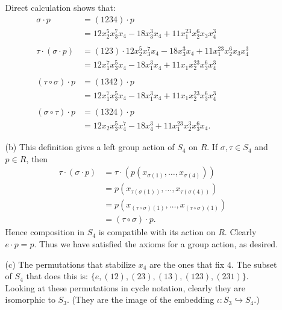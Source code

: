 \documentclass[12pt]{article}
\theoremstyle{remark}
\theoremstyle{named}
\begin{document}
\begin{enumerate}
\begin{enumerate}
        Direct calculation shows that:
        \begin{align*}
            \sigma \cdot p &= (1 2 3 4) \cdot p \\
            &= 12x_2^5 x_3^7 x_4 - 18 x_3^3 x_4 + 11 x_1^{23} x_2^6 x_3 x_4^3 \\ 
            \\
            \tau \cdot (\sigma \cdot p) &= (123) \cdot 12x_2^5 x_3^7 x_4 - 18 x_3^3 x_4 + 11 x_1^{23} x_2^6 x_3 x_4^3 \\
            &= 12 x_1^7 x_3^5 x_4 - 18 x_1^3 x_4 + 11 x_1 x_2^{23} x_3^6 x_4^3 \\ 
            \\
            (\tau \circ \sigma) \cdot p &= (1342) \cdot p \\ 
            &= 12 x_1^7 x_3^5 x_4 - 18 x_1^3 x_4 + 11 x_1 x_2^{23} x_3^6 x_4^3 \\ 
            \\
            (\sigma \circ \tau) \cdot p &= (1324) \cdot p \\
            &= 12 x_2 x_3^5 x_4^7 - 18 x_4^3 + 11 x_1^{23} x_2^3 x_3^6 x_4.
        \end{align*}

        \item[(b)] This definition gives a left group action of \(S_4\) on \(R\). If \(\sigma, \tau \in S_4\) and \(p \in R\), then 
        \begin{align*}
            \tau \cdot (\sigma \cdot p) &= \tau \cdot (p(x_{\sigma(1)}, \dots, x_{\sigma(4)})) \\
            &= p(x_{\tau(\sigma(1))}, \dots, x_{\tau(\sigma(4))}) \\
            &= p(x_{(\tau \circ \sigma) (1)}, \dots, x_{(\tau \circ \sigma) (1)}) \\
            &= (\tau \circ \sigma) \cdot p.
        \end{align*}
        Hence composition in \(S_4\) is compatible with its action on \(R\). Clearly \(e \cdot p = p\). Thus we have satisfied the axioms for a group action, as desired.

        \item[(c)] The permutations that stabilize \(x_4\) are the ones that fix \(4\). The subset of \(S_4\) that does this is: \(\{e, (12), (23), (13), (123), (231)\}\). Looking at these permutations in cycle notation, clearly they are isomorphic to \(S_3\). 
        (They are the image of the embedding \(\iota : S_3 \hookrightarrow S_4\).)
        

\end{enumerate}
\end{enumerate}
\end{document}
